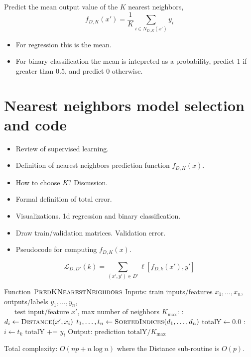 \documentclass{article}
\begin{document}
Predict the mean output value of the $K$ nearest
neighbors, $$f_{D,K}(x') = \frac 1 K \sum_{i\in N_{D,K}(x')} y_i$$

\begin{itemize}
\item For regression this is the mean.
\item For binary classification the mean is intepreted as a
  probability, predict 1 if greater than 0.5, and predict 0 otherwise.
\end{itemize}

\section{Nearest neighbors model selection and code}
\begin{itemize}
\item Review of supervised learning.
\item Definition of nearest neighbors prediction function $f_{D,K}(x)$.  
\item How to choose $K$? Discussion.
\item Formal definition of total error.
\item Visualizations. 1d regression and binary classification.
\item Draw train/validation matrices. Validation error.
\item Pseudocode for computing $f_{D,K}(x)$.
\end{itemize}

\begin{equation}
  \mathcal L_{D,D'}(k) = \sum_{(x',y')\in D'} \ell[f_{D,k}(x'), y']
\end{equation}

\begin{algorithmic}[1]
  \State Function $\textsc{PredKNearestNeighbors}$
  \State Inputs: train inputs/features $x_1,\dots,x_n$, outputs/labels $y_1,\dots,y_n$,\\ \ \ \ test input/feature $x'$, max number of neighbors $K_{\text{max}}$:
  :
  \State $d_i\gets \textsc{Distance}(x', x_i)$
  \EndFor
  \State $t_1,\dots,t_n\gets \textsc{SortedIndices}(d_1,\dots,d_n)$
  \State $\text{totalY}\gets 0.0$
  :
  \State $i\gets t_k$
  \State $\text{totalY} \texttt{ += } y_i$
  \State Output: prediction $\text{totalY}/K_{\text{max}}$
\end{algorithmic}
Total complexity: $O(np + n\log n)$ where the Distance sub-routine is $O(p)$.
\end{document}
